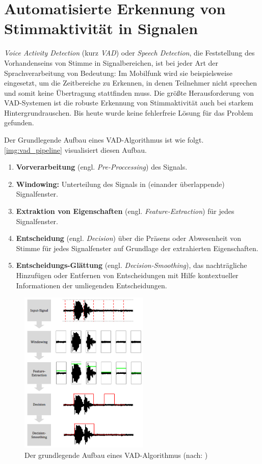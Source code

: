 \section{Automatisierte Erkennung von Stimmaktivität in Signalen}
\label{sec:vad_new}

\emph{Voice Activity Detection} (kurz \emph{VAD}) oder \emph{Speech Detection}, die Feststellung des Vorhandenseins von Stimme in Signalbereichen, ist bei jeder Art der Sprachverarbeitung von Bedeutung: Im Mobilfunk wird sie beispielsweise eingesetzt, um die Zeitbereiche zu Erkennen, in denen Teilnehmer nicht sprechen und somit keine Übertragung stattfinden muss. Die größte Herausforderung von VAD-Systemen ist die robuste Erkennung von Stimmaktivität auch bei starkem Hintergrundrauschen. Bis heute wurde keine fehlerfreie Lösung für das Problem gefunden. \cite[S. 1]{vad_granada} \cite[S. 1]{vad_kola} \cite[S. 1]{vad_Lisboa}

Der Grundlegende Aufbau eines VAD-Algorithmus ist wie folgt. \autoref{img:vad_pipeline} visualisiert diesen Aufbau.
\begin{enumerate}
	\item \textbf{Vorverarbeitung} (engl. \emph{Pre-Proccessing}) des Signals.
	\item \textbf{Windowing: } Unterteilung des Signals in (einander überlappende) Signalfenster.
	\item \textbf{Extraktion von Eigenschaften} (engl. \emph{Feature-Extraction}) für jedes Signalfenster.
	\item \textbf{Entscheidung} (engl. \emph{Decision}) über die Präsens oder Abwesenheit von Stimme für jedes Signalfenster auf Grundlage der extrahierten Eigenschaften.
	\item \textbf{Entscheidungs-Glättung} (engl. \emph{Decision-Smoothing}), das nachträgliche Hinzufügen oder Entfernen von Entscheidungen mit Hilfe kontextueller Informationen der umliegenden Entscheidungen.\cite[S. 8 - 9]{vad_granada} \cite[S. 1 - 2]{vad_kola}
\end{enumerate}

\begin{figure}[h]
	\centering
	\includegraphics[width=0.55\textwidth]{bilder/vad_pipeline_04.png}
	\caption[Der grundlegende Aufbau eines VAD-Algorithmus]{Der grundlegende Aufbau eines VAD-Algorithmus (nach: \cite[S. 8]{vad_granada})}
	\label{img:vad_pipeline}
\end{figure}


